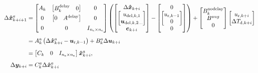 \begin{equation}
  \begin{split}
    \Delta \bm{\hat{x}}_{k+i+1}^a     & =
    \begin{bmatrix}
      A_k & \begin{bmatrix}B_k^\text{delay} & 0\end{bmatrix} & 0 \\[0.5em]
      0 & \begin{bmatrix} 0 & A^\text{delay} \end{bmatrix} & 0\\[0.5em]
      0 & 0 & I_{n_\text{e}\times n_\text{e}}
    \end{bmatrix}
    \left(\begin{bmatrix}
      \Delta \bm{\hat{x}}_{k+i}\\
      \begin{bmatrix}
        u_{\text{del},k,1}\\
        \bm{u}_{\text{del},k,2\ldots}\\
      \end{bmatrix}\\
      \bm{e}_{k+i}
    \end{bmatrix} -
    \begin{bmatrix}
      0\\
      \begin{bmatrix}
        u_{\text{r},k-1}\\
        0\\
      \end{bmatrix}\\
      0
    \end{bmatrix}
    \right) + 
    \begin{bmatrix}
      B_k^\text{nodelay}\\
      B^{aug}\\
      0
    \end{bmatrix}
    \begin{bmatrix}
      u_{\text{r},k+i}\\
      \Delta T_{\text{d},k+i}
    \end{bmatrix}\\[0.5em]
    & = A_k^a \left(\Delta \bm{\hat{x}}_{k+i}^a - \bm{u}_{\text{r},k-1}\right) + B_k^a \Delta \bm{u}_{k+i}\\[0.5em]
    & = \begin{bmatrix}
      C_k & 0 & I_{n_\text{e} \times n_\text{e}}
    \end{bmatrix}
    \bm{\hat{x}}_{k+i}^a,\\[0.5em]
    \Delta \bm{y}_{k+i} & = C_k^a \Delta \bm{\hat{x}}_{k+i}^a\\[0.5em]
  \end{split}
  \label{eq:mpc:augmented-state-eqs}
\end{equation}

